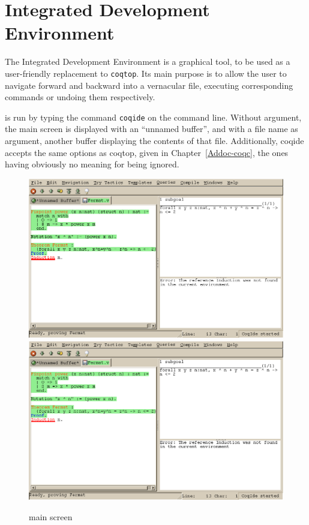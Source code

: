 \chapter{\Coq{} Integrated Development Environment}
\label{Addoc-coqide}

The \Coq{} Integrated Development Environment is a graphical tool, to
be used as a user-friendly replacement to \texttt{coqtop}. Its main
purpose is to allow the user to navigate forward and backward into a
\Coq{} vernacular file, executing corresponding commands or undoing
them respectively. %

\CoqIDE{} is run by typing the command \verb|coqide| on the command
line. Without argument, the main screen is displayed with an ``unnamed
buffer'', and with a file name as argument, another buffer displaying
the contents of that file. Additionally, coqide accepts the same
options as coqtop, given in Chapter~\ref{Addoc-coqc}, the ones having
obviously no meaning for \CoqIDE{} being ignored.

\begin{figure}[t]
\begin{center}
\ifpdf   %
\includegraphics[width=1.0\textwidth]{coqide.png}
\else
\includegraphics[width=1.0\textwidth]{coqide.eps}
\fi
\end{center}
\caption{\CoqIDE{} main screen}
\label{fig:coqide}
\end{figure}

